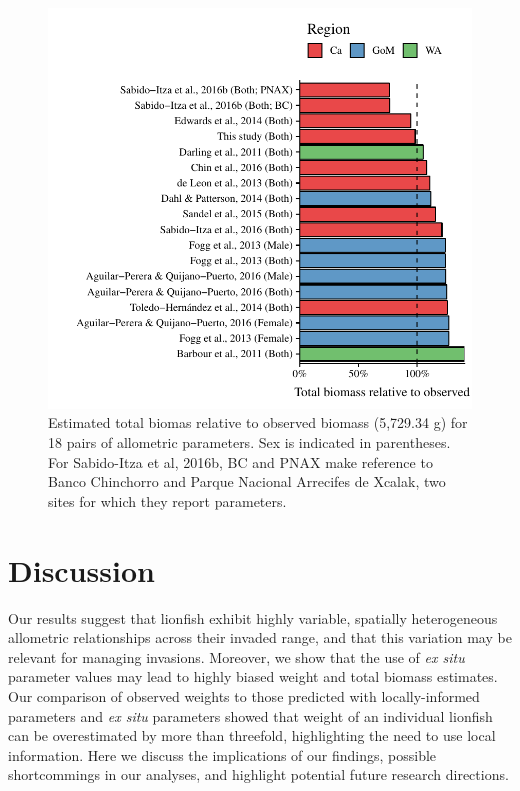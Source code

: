 \documentclass[fleqn,10pt,lineno]{wlpeerj} %
\begin{document}
\begin{figure}
\centering
\includegraphics{Manuscript_files/figure-latex/unnamed-chunk-9-1.pdf}
\caption{\label{fig:errors}Estimated total biomas relative to observed
biomass (5,729.34 g) for 18 pairs of allometric parameters. Sex is
indicated in parentheses. For Sabido-Itza et al, 2016b, BC and PNAX make
reference to Banco Chinchorro and Parque Nacional Arrecifes de Xcalak,
two sites for which they report parameters.}
\end{figure}

\clearpage

\section*{Discussion}

Our results suggest that lionfish exhibit highly variable, spatially
heterogeneous allometric relationships across their invaded range, and
that this variation may be relevant for managing invasions. Moreover, we
show that the use of \emph{ex situ} parameter values may lead to highly
biased weight and total biomass estimates. Our comparison of observed
weights to those predicted with locally-informed parameters and \emph{ex
situ} parameters showed that weight of an individual lionfish can be
overestimated by more than threefold, highlighting the need to use local
information. Here we discuss the implications of our findings, possible
shortcommings in our analyses, and highlight potential future research
directions.
\end{document}
